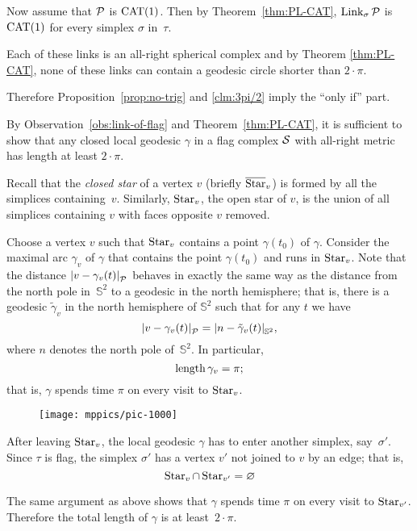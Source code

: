 Now assume that $\mathcal{P}$ is $\mathrm{CAT}(1)$.
Then by Theorem~\ref{thm:PL-CAT},
$\mathop{\rm Link}\nolimits_\sigma\mathcal{P}$ is $\mathrm{CAT}(1)$ for every simplex $\sigma$ 
in~$\tau$. 

Each of these links is an all-right spherical complex and by Theorem \ref{thm:PL-CAT}, none of these links can contain a geodesic circle shorter than $2\cdot\pi$. 

Therefore Proposition~\ref{prop:no-trig} and \ref{clm:3pi/2} 
imply the ``only if'' part.

By Observation~\ref{obs:link-of-flag} and Theorem~\ref{thm:PL-CAT},
it is sufficient to show that any closed local geodesic $\gamma$ 
in a flag complex $\mathcal{S}$ with all-right metric has length at least $2\cdot\pi$.

Recall that the  \emph{closed star} of a vertex $v$ (briefly $\overline {\mathop{\rm Star}\nolimits}_v$)
is formed by all the simplices containing~$v$. 
Similarly, $\mathop{\rm Star}\nolimits_v$, the open star of $v$, is the union of all simplices containing $v$ with faces opposite $v$ removed.

Choose a vertex $v$ such that $\mathop{\rm Star}\nolimits_v$ contains a point $\gamma(t_0)$ of $\gamma$.
Consider the maximal arc $\gamma_v$ of $\gamma$ 
that contains the point $\gamma(t_0)$
and runs in $\mathop{\rm Star}\nolimits_v$.
Note that the distance $\dist{v}{\gamma_v(t)}{\spc{P}}$ behaves in exactly the same way 
as the distance from the north pole in~$\mathbb{S}^2$ to a geodesic in the north hemisphere;
that is, there is a geodesic $\tilde\gamma_v$ in the north hemisphere of $\mathbb{S}^2$ such that for any $t$ we have
\[\dist{v}{\gamma_v(t)}{\spc{P}}
=
\dist{n}{\tilde\gamma_v(t)}{\mathbb{S}^2},\]
where $n$ denotes the north pole of~$\mathbb{S}^2$.
In particular, 
\[\mathop{\rm length}\nolimits\gamma_v=\pi;\]
that is, $\gamma$ spends time $\pi$ on every visit to $\mathop{\rm Star}\nolimits_v$.


\begin{wrapfigure}{r}{45mm}
\vskip-2mm
\centering
\texttt{[image: mppics/pic-1000]}
\end{wrapfigure}

After leaving $\mathop{\rm Star}\nolimits_v$,
the local geodesic $\gamma$ has to enter another simplex, 
say~$\sigma'$.
Since $\tau$ is flag, the simplex $\sigma'$
has a vertex $v'$ not joined to $v$ by an edge;
that is, 
\[\mathop{\rm Star}\nolimits_v\cap\mathop{\rm Star}\nolimits_{v'}=\varnothing\]

The same argument as above shows that $\gamma$ spends time $\pi$ on every visit to $\mathop{\rm Star}\nolimits_{v'}$.
Therefore the total length of $\gamma$ is at least~$2\cdot\pi$.
\qeds


